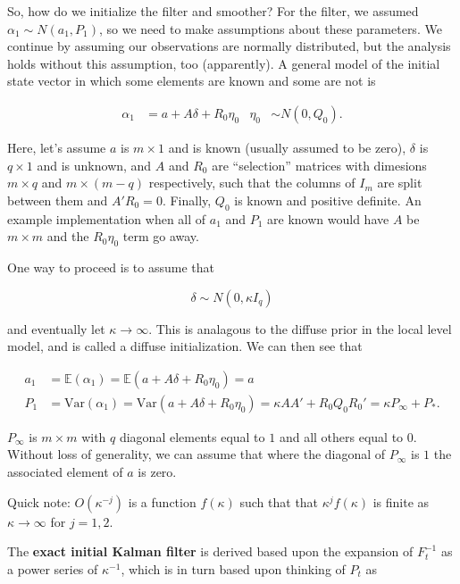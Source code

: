 \documentclass{tufte-book}
\begin{document}
So, how do we initialize the filter and smoother? For the filter, we assumed $\alpha_1 \sim N(a_1, P_1)$, so we need to make assumptions about these parameters. We continue by assuming our observations are normally distributed, but the analysis holds without this assumption, too (apparently). A general model of the initial state vector in which some elements are known and some are not is

\begin{align*}
\alpha_1 &= a + A\delta + R_0 \eta_0 & \eta_0 &\sim N(0, Q_0).
\end{align*}

\noindent Here, let's assume $a$ is $m \times 1$ and is known (usually assumed to be zero), $\delta$ is $q \times 1$ and is unknown, and $A$ and $R_0$ are ``selection'' matrices with dimesions $m \times q$ and $m \times (m-q)$ respectively, such that the columns of $I_m$ are split between them and $A'R_0 = 0$. Finally, $Q_0$ is known and positive definite. An example implementation when all of $a_1$ and $P_1$ are known would have $A$ be $m \times m$ and the $R_0 \eta_0$ term go away.

One way to proceed is to assume that 

\[
\delta \sim N(0, \kappa I_q)
\]

\noindent and eventually let $\kappa \rightarrow \infty$. This is analagous to the diffuse prior in the local level model, and is called a diffuse initialization. We can then see that

\begin{align*}
a_1 &= \mathbb{E}(\alpha_1) = \mathbb{E}(a + A\delta + R_0 \eta_0) = a \\
P_1 &= \text{Var}(\alpha_1) = \text{Var}(a + A\delta + R_0 \eta_0) = \kappa A A' + R_0 Q_0 R_0' = \kappa P_\infty + P_*.
\end{align*}

\noindent $P_\infty$ is $m \times m$ with $q$ diagonal elements equal to $1$ and all others equal to $0$. Without loss of generality, we can assume that where the diagonal of $P_\infty$ is $1$ the associated element of $a$ is zero.

Quick note: $O(\kappa^{-j})$ is a function $f(\kappa)$ such that that $\kappa^j f(\kappa)$ is finite as $\kappa \rightarrow \infty$ for $j = 1, 2$.

The \textbf{exact initial Kalman filter} is derived based upon the expansion of $F_t^{-1}$ as a power series of $\kappa^{-1}$, which is in turn based upon thinking of $P_t$ as 
\end{document}

